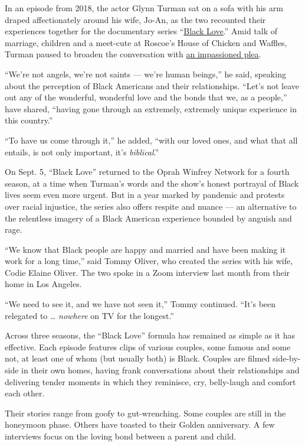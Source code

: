 In an episode from 2018, the actor Glynn Turman sat on a sofa with his
arm draped affectionately around his wife, Jo-An, as the two recounted
their experiences together for the documentary series
``\href{http://www.oprah.com/app/black-love.html}{Black Love}.'' Amid
talk of marriage, children and a meet-cute at Roscoe's House of Chicken
and Waffles, Turman paused to broaden the conversation with
\href{http://www.oprah.com/own-blacklove/glynn-turman-on-the-importance-of-black-love}{an
impassioned plea}.

``We're not angels, we're not saints --- we're human beings,'' he said,
speaking about the perception of Black Americans and their
relationships. ``Let's not leave out any of the wonderful, wonderful
love and the bonds that we, as a people,'' have shared, ``having gone
through an extremely, extremely unique experience in this country.''

``To have us come through it,'' he added, ``with our loved ones, and
what that all entails, is not only important, it's \emph{biblical}.''

On Sept. 5, ``Black Love'' returned to the Oprah Winfrey Network for a
fourth season, at a time when Turman's words and the show's honest
portrayal of Black lives seem even more urgent. But in a year marked by
pandemic and protests over racial injustice, the series also offers
respite and nuance --- an alternative to the relentless imagery of a
Black American experience bounded by anguish and rage.

``We know that Black people are happy and married and have been making
it work for a long time,'' said Tommy Oliver, who created the series
with his wife, Codie Elaine Oliver. The two spoke in a Zoom interview
last month from their home in Los Angeles.

``We need to see it, and we have not seen it,'' Tommy continued. ``It's
been relegated to \ldots{} \emph{nowhere} on TV for the longest.''

Across three seasons, the ``Black Love'' formula has remained as simple
as it has effective. Each episode features clips of various couples,
some famous and some not, at least one of whom (but usually both) is
Black. Couples are filmed side-by-side in their own homes, having frank
conversations about their relationships and delivering tender moments in
which they reminisce, cry, belly-laugh and comfort each other.

Their stories range from goofy to gut-wrenching. Some couples are still
in the honeymoon phase. Others have toasted to their Golden anniversary.
A few interviews focus on the loving bond between a parent and child.


